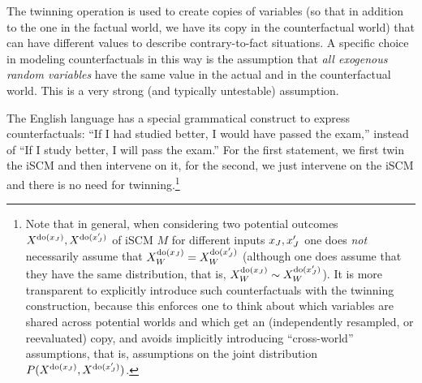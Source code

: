 The twinning operation is used to create copies of variables (so that in addition to the one in the factual world, 
we have its copy in the counterfactual world) that can have different values to describe contrary-to-fact situations.
A specific choice in modeling counterfactuals in this way is the assumption that \emph{all exogenous random variables}
have the same value in the actual and in the counterfactual world. This is a very strong (and typically untestable)
assumption.

The English language has a special grammatical construct to express counterfactuals:
``If I had studied better, I would have passed the exam,'' instead of ``If I study better, I will pass the exam.''
For the first statement, we first twin the iSCM and then intervene on it, for the second, we just intervene on the iSCM and there is no need for twinning.\footnote{Note 
that in general, when considering two potential outcomes $X^{\operatorname{do}(x_J)},X^{\operatorname{do}(x_J')}$ of iSCM $M$ for different inputs $x_{J}, x_{J}'$ one does \emph{not} necessarily assume that $X_{W}^{\operatorname{do}(x_J)} = X_{W}^{\operatorname{do}(x_J')}$ (although one does assume
that they have the same distribution, that is, $X_{W}^{\operatorname{do}(x_J)} \sim X_{W}^{\operatorname{do}(x_J')}$). 
It is more transparent to explicitly introduce such counterfactuals with the twinning construction, because this enforces one to think about which variables are shared across potential worlds and which get an (independently resampled, or reevaluated) copy, and avoids implicitly introducing ``cross-world'' assumptions, that is, assumptions on the joint distribution $P(X^{\operatorname{do}(x_J)},X^{\operatorname{do}(x_J')})$.}

